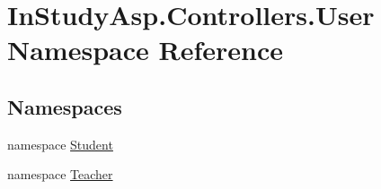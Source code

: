 \hypertarget{namespace_in_study_asp_1_1_controllers_1_1_user}{}\section{In\+Study\+Asp.\+Controllers.\+User Namespace Reference}
\label{namespace_in_study_asp_1_1_controllers_1_1_user}
\subsection*{Namespaces}
\begin{DoxyCompactItemize}
\item 
namespace \hyperlink{namespace_in_study_asp_1_1_controllers_1_1_user_1_1_student}{Student}
\item 
namespace \hyperlink{namespace_in_study_asp_1_1_controllers_1_1_user_1_1_teacher}{Teacher}
\end{DoxyCompactItemize}
